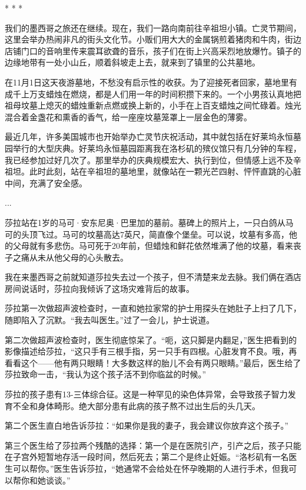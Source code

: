 \documentclass[12pt,oneside]{book}
\begin{document}
\begin{bookref}[frametitle={\cite{好好告别}}]
\begin{center}
* * *
\end{center}

我们的墨西哥之旅还在继续。现在，我们一路向南前往辛祖坦小镇。亡灵节期间，这里会举办热闹非凡的街头文化节。小贩们用大大的金属锅煎着猪肉和牛肉，街边店铺门口的音响里传来震耳欲聋的音乐，孩子们在街上兴高采烈地放爆竹。镇子的边缘地带有一处小山丘，顺着斜坡走上去，就来到了镇里的公共墓地。

在11月1日这天夜游墓地，不愁没有启示性的收获。为了迎接死者回家，墓地里有成千上万支蜡烛在燃烧，都是人们用一年的时间积攒下来的。一个小男孩认真地把祖母坟墓上熄灭的蜡烛重新点燃或换上新的，小手在上百支蜡烛之间忙碌着。烛光混合着金盏花和熏香的香气，给一座座坟墓笼罩上一层金色的薄雾。

最近几年，许多美国城市也开始举办亡灵节庆祝活动，其中就包括在好莱坞永恒墓园举行的大型庆典。好莱坞永恒墓园距离我在洛杉矶的殡仪馆只有几分钟的车程，我已经参加过好几次了。那里举办的庆典规模宏大、执行到位，但情感上远不及辛祖坦。此时此刻，站在辛祖坦的墓地里，就像站在一颗光芒四射、怦怦直跳的心脏中间，充满了安全感。

...

莎拉站在1岁的马可·安东尼奥·巴里加的墓前。墓碑上的照片上，一只白鸽从马可的头顶飞过。马可的坟墓高达7英尺，简直像个堡垒。可以说，坟墓有多高，他的父母就有多悲伤。马可死于20年前，但蜡烛和鲜花依然堆满了他的坟墓，看来丧子之痛从未从他父母的心头散去。

我在来墨西哥之前就知道莎拉失去过一个孩子，但不清楚来龙去脉。我们俩在酒店房间说话时，莎拉向我倾诉了这场灾难背后的故事。

莎拉第一次做超声波检查时，一直和她拉家常的护士用探头在她肚子上扫了几下，随即陷入了沉默。“我去叫医生。”过了一会儿，护士说道。

第二次做超声波检查时，医生彻底惊呆了。“呃，这只脚是内翻足，”医生把看到的影像描述给莎拉，“这只手有三根手指，另一只手有四根。心脏发育不良。哦，再看看这个——他有两只眼睛！大多数这样的胎儿不会有两只眼睛。”最后，医生给了莎拉致命一击，“我认为这个孩子活不到你临盆的时候。”

莎拉的孩子患有13-三体综合征。这是一种罕见的染色体异常，会导致孩子智力发育不全和身体畸形。绝大部分患有此病的孩子熬不过出生后的头几天。

第二个医生直白地告诉莎拉：“如果你是我的妻子，我会建议你放弃这个孩子。”

第三个医生给了莎拉两个残酷的选择：第一个是在医院引产，引产之后，孩子只能在子宫外短暂地存活一段时间，然后死去；第二个是终止妊娠。“洛杉矶有一名医生可以帮你。”医生告诉莎拉，“她通常不会给处在怀孕晚期的人进行手术，但我可以帮你和她谈谈。”


\end{bookref}
\end{document}
